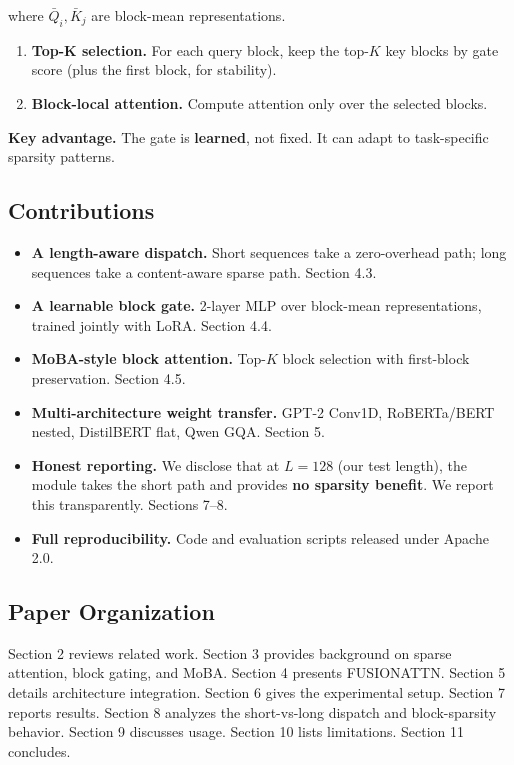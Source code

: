 where $\bar{Q}_i, \bar{K}_j$ are block-mean representations.

\begin{enumerate}
\item \textbf{Top-K selection.} For each query block, keep the top-$K$ key blocks
  by gate score (plus the first block, for stability).
\item \textbf{Block-local attention.} Compute attention only over the selected
  blocks.

\end{enumerate}
\textbf{Key advantage.} The gate is \textbf{learned}, not fixed. It can adapt to 
task-specific sparsity patterns.

\subsection{Contributions}

\begin{itemize}
\item \textbf{A length-aware dispatch.} Short sequences take a zero-overhead path;
  long sequences take a content-aware sparse path. Section 4.3.
\item \textbf{A learnable block gate.} 2-layer MLP over block-mean representations,
  trained jointly with LoRA. Section 4.4.
\item \textbf{MoBA-style block attention.} Top-$K$ block selection with first-block
  preservation. Section 4.5.
\item \textbf{Multi-architecture weight transfer.} GPT-2 Conv1D, RoBERTa/BERT nested,
  DistilBERT flat, Qwen GQA. Section 5.
\item \textbf{Honest reporting.} We disclose that at $L = 128$ (our test length), the
  module takes the short path and provides \textbf{no sparsity benefit}. We
  report this transparently. Sections 7--8.
\item \textbf{Full reproducibility.} Code and evaluation scripts released under
  Apache 2.0.

\end{itemize}
\subsection{Paper Organization}

Section 2 reviews related work. Section 3 provides background on sparse 
attention, block gating, and MoBA. Section 4 presents FUSIONATTN. Section 
5 details architecture integration. Section 6 gives the experimental 
setup. Section 7 reports results. Section 8 analyzes the short-vs-long 
dispatch and block-sparsity behavior. Section 9 discusses usage. Section 
10 lists limitations. Section 11 concludes.



